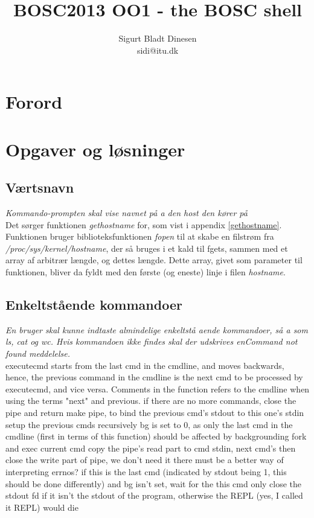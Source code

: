\documentclass[a4paper, titlepage, draft]{article}
\begin{document}
\title{BOSC2013 OO1 - the BOSC shell}
\author{Sigurt Bladt Dinesen \\sidi{@}itu.dk}
\maketitle
\section*{Forord}
\section*{Opgaver og løsninger}
\subsection*{Værtsnavn}
\textit{Kommando-prompten skal vise navnet på a den host den kører på}\\

Det sørger funktionen \emph{gethostname} for, som vist i appendix
\ref{gethostname}. Funktionen bruger biblioteksfunktionen \emph{fopen} til at
skabe en filstrøm fra \emph{/proc/sys/\linebreak[0]kernel/hostname}, der så bruges i et kald
til fgets, sammen med et array af arbitrær længde, og dettes længde. Dette
array, givet som parameter til funktionen, bliver da fyldt med den første (og
eneste) linje i filen \emph{hostname}.

\subsection*{Enkeltstående kommandoer}
\textit{ En bruger skal kunne indtaste almindelige enkeltstå aende kommandoer, så a som
	ls, cat og wc. Hvis kommandoen ikke findes skal der udskrives enCommand
	not found meddelelse.}\\

executecmd starts from the last cmd in the cmdline, and moves backwards,
hence, the previous command in the cmdline is the next cmd to be processed
by executecmd, and vice versa.
Comments in the function refers to the cmdline when using the terms "next"
and previous.
if there are no more commands,
close the pipe and return
make pipe, to bind the previous cmd's stdout to this one's stdin
setup the previous cmds recursively
bg is set to 0, as only the last cmd in the cmdline (first in terms of this function)
should be affected by backgrounding
fork and exec current cmd
copy the pipe's read part to cmd stdin,
next cmd's
then close the write part of pipe, we don't need it
there must be a better way of interpreting errnos?
if this is the last cmd (indicated by stdout being 1, this should be done
differently) and bg isn't set, wait for the this cmd
only close the stdout fd if it isn't the stdout of the program,
otherwise the REPL (yes, I called it REPL) would die
\newpage
\appendix

\end{document}
